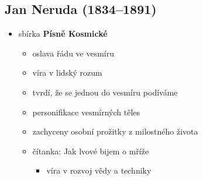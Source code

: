 \subsection{Jan Neruda (1834--1891)}
\begin{itemize}
\item sbírka \textbf{Písně Kosmické}
	\begin{itemize}
	\item oslava řádu ve vesmíru
	\item víra v lidský rozum
	\item tvrdí, že se jednou do vesmíru podíváme
	\item personifikace vesmírných těles
	\item zachyceny osobní prožitky z milostného života
	\item čítanka: Jak lvové bijem o mříže
		\begin{itemize}
		\item víra v rozvoj vědy a techniky
		\end{itemize}
		

\end{itemize}
\end{itemize}
